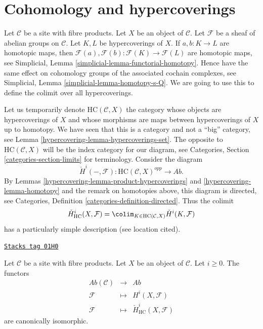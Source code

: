 \section{Cohomology and hypercoverings}
\label{hypercovering-section-cohomology}
Let $\mathcal{C}$ be a site with fibre products.
Let $X$ be an object of $\mathcal{C}$.
Let $\mathcal{F}$ be a sheaf of abelian groups on $\mathcal{C}$.
Let $K, L$ be hypercoverings of $X$.
If $a, b : K \to L$ are homotopic maps,
then $\mathcal{F}(a), \mathcal{F}(b) : \mathcal{F}(K) \to \mathcal{F}(L)$
are homotopic maps, see
Simplicial, Lemma \ref{simplicial-lemma-functorial-homotopy}.
Hence have the same effect on cohomology groups of the associated
cochain complexes, see
Simplicial, Lemma \ref{simplicial-lemma-homotopy-s-Q}.
We are going to use this to define the colimit over all
hypercoverings.

\medskip\noindent
Let us temporarily denote $\text{HC}(\mathcal{C}, X)$
the category whose objects are hypercoverings of $X$
and whose morphisms are maps between hypercoverings of $X$
up to homotopy. We have seen that
this is a category and not a ``big'' category,
see Lemma \ref{hypercovering-lemma-hypercoverings-set}.
The opposite to $\text{HC}(\mathcal{C}, X)$
will be the index category for our diagram, see
Categories, Section \ref{categories-section-limits} for terminology.
Consider the diagram
$$
\check{H}^i(-, \mathcal{F}) :
\text{HC}(\mathcal{C}, X)^{opp}
\longrightarrow
\textit{Ab}.
$$
By Lemmas \ref{hypercovering-lemma-product-hypercoverings} and \ref{hypercovering-lemma-homotopy}
and the remark on homotopies above, this diagram is directed, see
Categories, Definition \ref{categories-definition-directed}.
Thus the colimit
$$
\check{H}^i_{\text{HC}}(X, \mathcal{F}) =
\colim_{K \in \text{HC}(\mathcal{C}, X)} \check{H}^i(K, \mathcal{F})
$$
has a particularly simple description (see location cited).

\begin{theorem}
\label{hypercovering-theorem-cohomology-hypercoverings}
\href{https://stacks.math.columbia.edu/tag/01H0}{\texttt{Stacks tag 01H0}}

Let $\mathcal{C}$ be a site with fibre products.
Let $X$ be an object of $\mathcal{C}$. Let $i \geq 0$.
The functors
\begin{eqnarray*}
\textit{Ab}(\mathcal{C}) & \longrightarrow & \textit{Ab} \\
\mathcal{F} & \longmapsto & H^i(X, \mathcal{F}) \\
\mathcal{F} & \longmapsto & \check{H}^i_{\text{HC}}(X, \mathcal{F})
\end{eqnarray*}
are canonically isomorphic.
\end{theorem}

